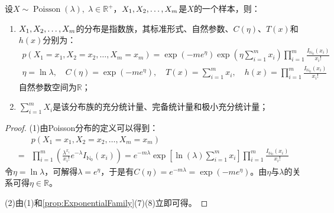 \begin{theorem}
	设$X\sim\operatorname{Poisson}(\lambda),\;\lambda\in\mathbb{R}^+$，$X_1, X_2, \dots, X_{m}$是$X$的一个样本，则：
	\begin{enumerate}
		\item $X_1, X_2, \dots, X_{m}$的分布是指数族，其标准形式、自然参数、$C(\eta)$、$T(x)$和$h(x)$分别为：
		\begin{gather*}
			p(X_1=x_1,X_2=x_2,\dots,X_m=x_m)=\exp(-me^{\eta})\exp\left(\eta\sum_{i=1}^{m}x_i\right)\prod_{i=1}^{m}\frac{I_{\mathbb{N}_0}(x_i)}{x_i!} \\
			\eta=\ln\lambda,\quad C(\eta)=\exp(-me^{\eta}),\quad T(x)=\sum_{i=1}^{m}x_i,\quad h(x)=\prod_{i=1}^{m}\frac{I_{\mathbb{N}_0}(x_i)}{x_i!}
		\end{gather*}
		自然参数空间为$\mathbb{R}$；
		\item $\sum\limits_{i=1}^{m}X_i$是该分布族的充分统计量、完备统计量和极小充分统计量；
	\end{enumerate}
\end{theorem}
\begin{proof}
	(1)由Poisson分布的定义可以得到：
	\begin{align*}
		&p(X_1=x_1,X_2=x_2,\dots,X_m=x_m) \\
		=&\prod_{i=1}^{m}\left(\frac{\lambda^{x_i}}{x_i!}e^{-\lambda}I_{\mathbb{N}_0}(x_i)\right) =e^{-m\lambda}\exp\left[\ln(\lambda)\sum_{i=1}^{m}x_i\right]\prod_{i=1}^{m}\frac{I_{\mathbb{N}_0}(x_i)}{x_i!}
	\end{align*}
	令$\eta=\ln\lambda$，可解得$\lambda=e^{\eta}$，于是有$C(\eta)=e^{-m\lambda}=\exp(-me^{\eta})$。由$\eta$与$\lambda$的关系可得$\eta\in\mathbb{R}$。\par
	(2)由(1)和\cref{prop:ExponentialFamily}(7)(8)立即可得。
\end{proof}

